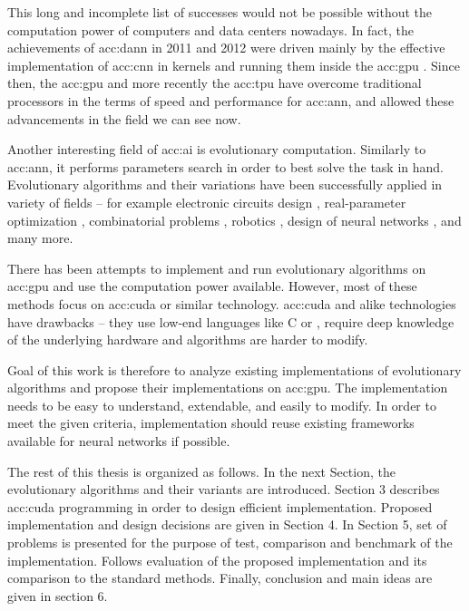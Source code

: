 This long and incomplete list of successes would not be possible without the computation power of computers and data centers nowadays. In fact, the achievements of \acrshort{acc:dann} in 2011 and 2012 were driven mainly by the effective implementation of \acrfull{acc:cnn} in kernels and running them inside the \acrfull{acc:gpu} \citep{CIRESAN2012333}. Since then, the \acrshort{acc:gpu} and more recently the \acrfull{acc:tpu} have overcome traditional processors in the terms of speed and performance for \acrshort{acc:ann}, and allowed these advancements in the field we can see now.

Another interesting field of \acrlong{acc:ai} is evolutionary computation. Similarly to \acrshort{acc:ann}, it performs parameters search in order to best solve the task in hand. Evolutionary algorithms and their variations have been successfully applied in variety of fields -- for example 
electronic circuits design \citep{NASAantenaDesign}\allowbreak\citep{circuitdesignoptimizationea},
real-parameter optimization \citep{IntroNaturalEvolutionStrategies}, 
combinatorial problems \citep{GeneticAssambleLineBalancingProblem}\allowbreak\citep{ALBAYRAK20111313},\linebreak
robotics \citep{EvolutionaryRobotics}\allowbreak\citep{RoboticsInPhysX}\allowbreak\citep{nygaard2018realworld},
design of neural networks \citep{NEAT}\allowbreak\citep{Floreano2008NeuroevolutionFA},
and many more.

There has been attempts to implement and run evolutionary algorithms on \acrshort{acc:gpu} \citep{CHENG2019514} and use the computation power available. However, most of these methods focus on \acrfull{acc:cuda} or similar technology. \acrshort{acc:cuda} and alike technologies have drawbacks -- they use low-end languages like C or \cpp, require deep knowledge of the underlying hardware and algorithms are harder to modify.

Goal of this work is therefore to analyze existing implementations of evolutionary algorithms and propose their implementations on \acrshort{acc:gpu}. The implementation needs to be easy to understand, extendable, and easily to modify. In order to meet the given criteria, implementation should reuse existing frameworks available for neural networks if possible.

The rest of this thesis is organized as follows. 
In the next Section, the evolutionary algorithms and their variants are introduced. 
Section 3 describes \acrshort{acc:cuda} programming in order to  design efficient implementation.
Proposed implementation and design decisions are given in Section 4. 
In Section 5, set of problems is presented for the purpose of test, comparison and benchmark of the implementation. Follows evaluation of the proposed implementation and its comparison to the standard methods.
Finally, conclusion and main ideas are given in section 6.
